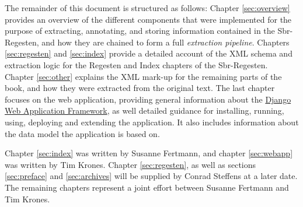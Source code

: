 The remainder of this document is structured as follows: Chapter
\ref{sec:overview} provides an overview of the different components
that were implemented for the purpose of extracting, annotating, and
storing information contained in the Sbr-Regesten, and how they are
chained to form a full \emph{extraction pipeline}. Chapters
\ref{sec:regesten} and \ref{sec:index} provide a detailed account of
the XML schema and extraction logic for the Regesten and Index
chapters of the Sbr-Regesten. Chapter \ref{sec:other} explains the XML
mark-up for the remaining parts of the book, and how they were
extracted from the original text. The last chapter focuses on the web
application, providing general information about the
\href{https://www.djangoproject.com/}{Django Web Application
  Framework}, as well detailed guidance for installing, running,
using, deploying and extending the application. It also includes
information about the data model the application is based on.

Chapter \ref{sec:index} was written by Susanne Fertmann, and chapter
\ref{sec:webapp} was written by Tim Krones. Chapter
\ref{sec:regesten}, as well as sections \ref{sec:preface} and
\ref{sec:archives} will be supplied by Conrad Steffens at a later
date. The remaining chapters represent a joint effort between Susanne
Fertmann and Tim Krones.
